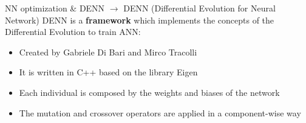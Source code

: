 \documentclass[xcolor={usenames}]{beamer}
\begin{document}
  \begin{frame}{NN optimization \& DENN \(\rightarrow\) DENN (Differential Evolution for Neural Network)}
  	DENN \cite{denn2017mod} is a \textbf{framework} which implements the concepts of the Differential Evolution to train ANN:
  	\begin{itemize}
		\item{Created by Gabriele Di Bari and Mirco Tracolli}
		\item{It is written in C++ based on the library Eigen}
		\item{Each individual is composed by the weights and biases of the network}
		\item{The mutation and crossover operators are applied in a component-wise way}
	\end{itemize}
  \end{frame}
\end{document}
